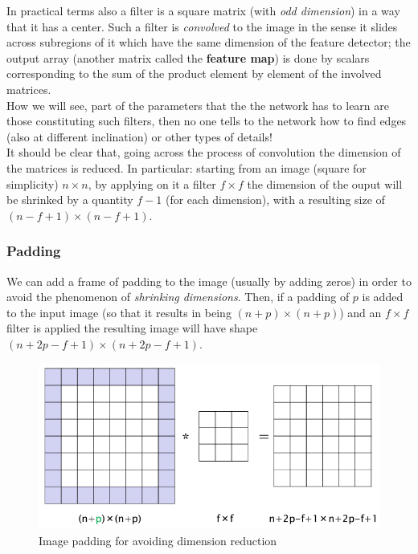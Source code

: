 \noindent
In practical terms also a filter is a square matrix (with \textit{odd dimension}) in a way that it has a center. Such a filter is \textit{convolved} to the image in the sense it slides across subregions of it which have the same dimension of the feature detector; the output array (another matrix called the \textbf{feature map}) is done by scalars corresponding to the sum of the product element by element of the involved matrices. \\
How we will see, part of the parameters that the the network has to learn are those constituting such filters, then no one tells to the network how to find edges (also at different inclination) or other types of details!\\
 It should be clear that, going across the process of convolution the dimension of the matrices is reduced. In particular: starting from an image (square for simplicity) $n\times{n}$, by applying on it a filter $f\times{f}$ the dimension of the ouput will be shrinked by a quantity $f-1$ (for each dimension), with a resulting size of $(n-f+1)\times{(n-f+1)}$.

\subsubsection{Padding}
We can add a frame of padding to the image (usually by adding zeros) in order to avoid the phenomenon of \textit{shrinking dimensions}. Then, if a padding of $p$ is added to the input image (so that it results in being $(n+p)\times(n+p)$) and an $f\times{f}$ filter is applied the resulting image will have shape $(n+2p-f+1)\times{(n+2p-f+1)}$.

\begin{figure}
    \centering
    \includegraphics[scale=0.6]{img/CNN_padding.png}
    \caption{Image padding for avoiding dimension reduction}
\end{figure}

